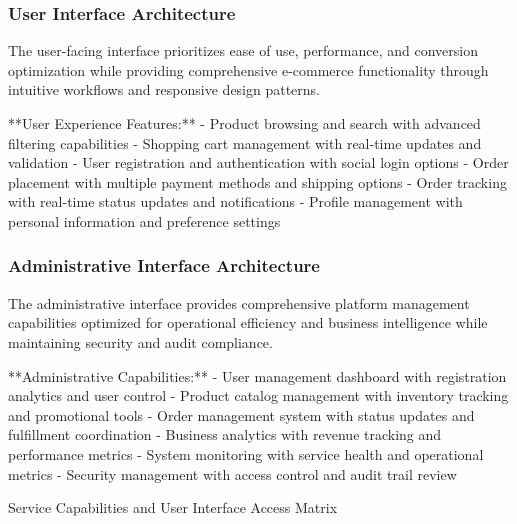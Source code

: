\subsubsection{User Interface Architecture}
The user-facing interface prioritizes ease of use, performance, and conversion optimization while providing comprehensive e-commerce functionality through intuitive workflows and responsive design patterns.

**User Experience Features:**
- Product browsing and search with advanced filtering capabilities
- Shopping cart management with real-time updates and validation
- User registration and authentication with social login options
- Order placement with multiple payment methods and shipping options
- Order tracking with real-time status updates and notifications
- Profile management with personal information and preference settings

\subsubsection{Administrative Interface Architecture}
The administrative interface provides comprehensive platform management capabilities optimized for operational efficiency and business intelligence while maintaining security and audit compliance.

**Administrative Capabilities:**
- User management dashboard with registration analytics and user control
- Product catalog management with inventory tracking and promotional tools
- Order management system with status updates and fulfillment coordination
- Business analytics with revenue tracking and performance metrics
- System monitoring with service health and operational metrics
- Security management with access control and audit trail review

\begin{table}[H]
\centering
\caption{Service Capabilities and User Interface Access Matrix}
\label{tab:service-capabilities-matrix}
\end{table}